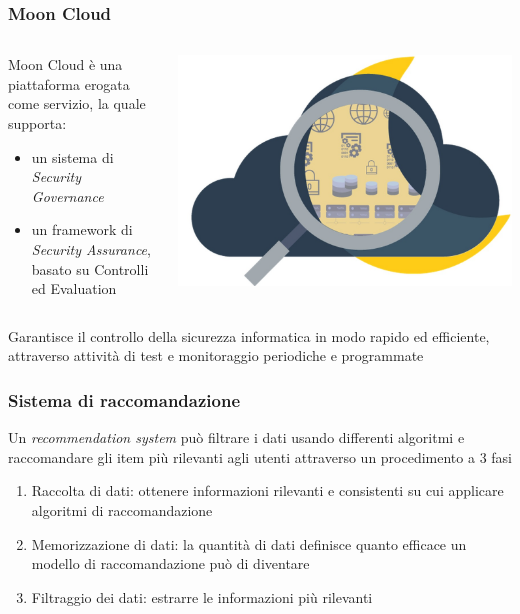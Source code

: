 \begin{frame}
    \frametitle{Moon Cloud}
    \begin{columns}
        \begin{column}{0.55\textwidth}
            Moon Cloud è una piattaforma erogata come servizio, la quale supporta:
            \begin{itemize}
                \item un sistema di \textit{Security Governance}
                \item un framework di \alert{\textit{Security Assurance}}, basato su Controlli ed Evaluation
            \end{itemize}
        \end{column}
        \begin{column}{0.4\textwidth}
            \begin{center}
                \includegraphics[scale=0.12]{images/mc}
            \end{center}
        \end{column}
    \end{columns}
    Garantisce il controllo della sicurezza informatica in modo rapido ed efficiente, attraverso attività di test e monitoraggio 
    periodiche e programmate
\end{frame}

\begin{frame}
    \frametitle{Sistema di raccomandazione}
    Un \textit{recommendation system} può filtrare i dati usando differenti algoritmi e raccomandare gli item più rilevanti agli utenti attraverso 
    un procedimento a 3 fasi
    \begin{enumerate}
        \item \alert{Raccolta di dati}: ottenere informazioni rilevanti e consistenti su cui applicare algoritmi di raccomandazione
        \item \alert{Memorizzazione di dati}: la quantità di dati definisce quanto efficace un modello di raccomandazione può di diventare
        \item \alert{Filtraggio dei dati}: estrarre le informazioni più rilevanti
    \end{enumerate}
\end{frame}

